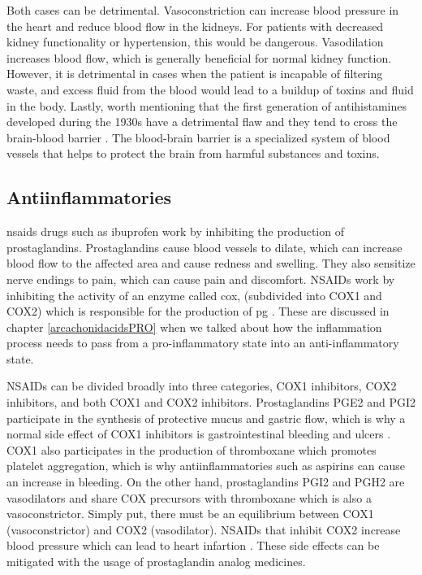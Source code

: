 Both cases can be detrimental. Vasoconstriction can increase blood pressure in the heart and reduce blood flow in the kidneys. For patients with decreased kidney functionality or hypertension, this would be dangerous. Vasodilation increases blood flow, which is generally beneficial for normal kidney function. However, it is detrimental in cases when the patient is incapable of filtering waste, and excess fluid from the blood would lead to a buildup of toxins and fluid in the body. Lastly, worth mentioning that the first generation of antihistamines developed during the 1930s have a detrimental flaw and they tend to cross the brain-blood barrier \cite{Walsh2005}. The blood-brain barrier is a specialized system of blood vessels that helps to protect the brain from harmful substances and toxins.

\subsection{Antiinflammatories}

\gls{nsaids} drugs such as ibuprofen work by inhibiting the production of prostaglandins. Prostaglandins cause blood vessels to dilate, which can increase blood flow to the affected area and cause redness and swelling. They also sensitize nerve endings to pain, which can cause pain and discomfort. NSAIDs work by inhibiting the activity of an enzyme called \gls{cox}, (subdivided into COX1 and COX2) which is responsible for the production of \gls{pg} \cite{Faki2021}. These are discussed in chapter \ref{arcachonidacidsPRO} when we talked about how the inflammation process needs to pass from a pro-inflammatory state into an anti-inflammatory state.

NSAIDs can be divided broadly into three categories, COX1 inhibitors, COX2 inhibitors, and both COX1 and COX2 inhibitors. Prostaglandins PGE2 and PGI2 participate in the synthesis of protective mucus and gastric flow, which is why a normal side effect of COX1 inhibitors is gastrointestinal bleeding and ulcers \cite{Faki2021}. COX1 also participates in the production of thromboxane which promotes platelet aggregation, which is why antiinflammatories such as aspirins can cause an increase in bleeding. On the other hand, prostaglandins PGI2 and PGH2 are vasodilators and share COX precursors with thromboxane which is also a vasoconstrictor. Simply put, there must be an equilibrium between COX1 (vasoconstrictor) and COX2 (vasodilator). NSAIDs that inhibit COX2 increase blood pressure which can lead to heart infartion \cite{Faki2021}. These side effects can be mitigated with the usage of prostaglandin analog medicines.

